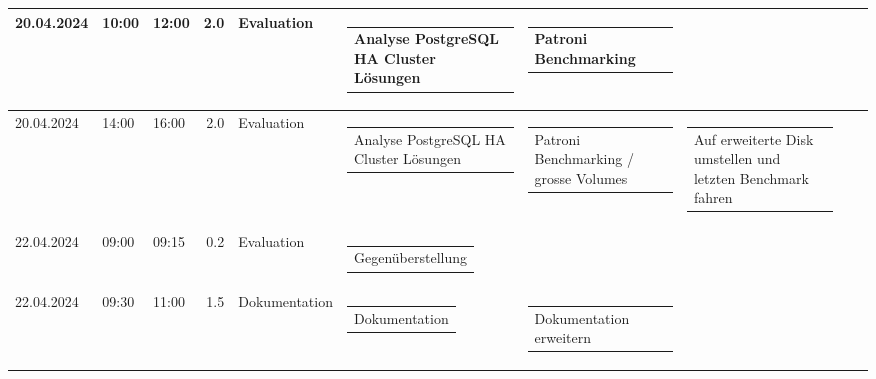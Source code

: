 {\begin{longtable}[H]{lllrllllll}
20.04.2024 & 10:00 & 12:00 & 2.0 & Evaluation & \begin{tabular}[c]{@{}l@{}}Analyse PostgreSQL HA Cluster Lösungen\end{tabular} & \begin{tabular}[c]{@{}l@{}}Patroni Benchmarking\end{tabular} & \begin{tabular}[c]{@{}l@{}}\end{tabular} & \begin{tabular}[c]{@{}l@{}}\end{tabular} & \begin{tabular}[c]{@{}l@{}}\end{tabular} \\ \midrule
20.04.2024 & 14:00 & 16:00 & 2.0 & Evaluation & \begin{tabular}[c]{@{}l@{}}Analyse PostgreSQL HA Cluster Lösungen\end{tabular} & \begin{tabular}[c]{@{}l@{}}Patroni Benchmarking / grosse Volumes\end{tabular} & \begin{tabular}[c]{@{}l@{}}Auf erweiterte Disk umstellen und letzten Benchmark fahren\end{tabular} & \begin{tabular}[c]{@{}l@{}}\end{tabular} & \begin{tabular}[c]{@{}l@{}}\end{tabular} \\ \midrule
22.04.2024 & 09:00 & 09:15 & 0.2 & Evaluation & \begin{tabular}[c]{@{}l@{}}Gegenüberstellung\end{tabular} & \begin{tabular}[c]{@{}l@{}}\end{tabular} & \begin{tabular}[c]{@{}l@{}}\end{tabular} & \begin{tabular}[c]{@{}l@{}}\end{tabular} & \begin{tabular}[c]{@{}l@{}}\end{tabular} \\ \midrule
22.04.2024 & 09:30 & 11:00 & 1.5 & Dokumentation & \begin{tabular}[c]{@{}l@{}}Dokumentation\end{tabular} & \begin{tabular}[c]{@{}l@{}}Dokumentation erweitern\end{tabular} & \begin{tabular}[c]{@{}l@{}}\end{tabular} & \begin{tabular}[c]{@{}l@{}}\end{tabular} & \begin{tabular}[c]{@{}l@{}}\end{tabular} \\ \midrule

\end{longtable}}
